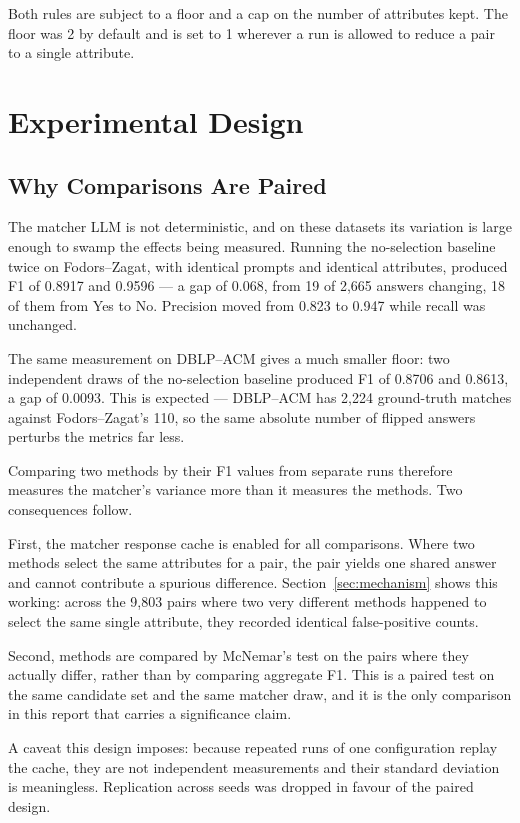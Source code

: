 \documentclass[11pt]{article}
\begin{document}
Both rules are subject to a floor and a cap on the number of attributes kept. The floor was
2 by default and is set to 1 wherever a run is allowed to reduce a pair to a single
attribute.

\section{Experimental Design}
\label{sec:design}

\subsection{Why Comparisons Are Paired}
\label{sec:paired}

The matcher LLM is not deterministic, and on these datasets its variation is large enough to
swamp the effects being measured. Running the no-selection baseline twice on Fodors--Zagat,
with identical prompts and identical attributes, produced F1 of 0.8917 and 0.9596 --- a gap
of 0.068, from 19 of 2{,}665 answers changing, 18 of them from Yes to No. Precision moved
from 0.823 to 0.947 while recall was unchanged.

The same measurement on DBLP--ACM gives a much smaller floor: two independent draws of the
no-selection baseline produced F1 of 0.8706 and 0.8613, a gap of 0.0093. This is expected ---
DBLP--ACM has 2{,}224 ground-truth matches against Fodors--Zagat's 110, so the same absolute
number of flipped answers perturbs the metrics far less.

Comparing two methods by their F1 values from separate runs therefore measures the matcher's
variance more than it measures the methods. Two consequences follow.

First, the matcher response cache is enabled for all comparisons. Where two methods select
the same attributes for a pair, the pair yields one shared answer and cannot contribute a
spurious difference. Section~\ref{sec:mechanism} shows this working: across the 9{,}803 pairs
where two very different methods happened to select the same single attribute, they recorded
identical false-positive counts.

Second, methods are compared by McNemar's test on the pairs where they actually differ,
rather than by comparing aggregate F1. This is a paired test on the same candidate set and
the same matcher draw, and it is the only comparison in this report that carries a
significance claim.

A caveat this design imposes: because repeated runs of one configuration replay the cache,
they are not independent measurements and their standard deviation is meaningless.
Replication across seeds was dropped in favour of the paired design.
\end{document}
